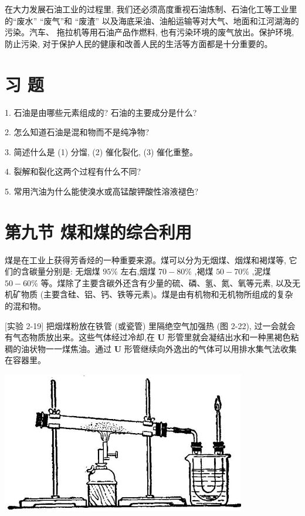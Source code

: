 \documentclass[10pt]{article}
\begin{document}
在大力发展石油工业的过程里, 我们还必须高度重视石油炼制、石油化工等工业里的“废水” “废气”和 “废渣” 以及海底采油、油船运输等对大气、地面和江河湖海的污染。汽车、 拖拉机等用石油产品作燃料, 也有污染环境的废气放出。保护环境, 防止污染, 对于保护人民的健康和改善人民的生活等方面都是十分重要的。

\section*{习 题}

1. 石油是由哪些元素组成的? 石油的主要成分是什么?

2. 怎么知道石油是混和物而不是纯净物?

3. 简述什么是 (1) 分馏, (2) 催化裂化, (3) 催化重整。

4. 裂解和裂化这两个过程有什么不同?

5. 常用汽油为什么能使溴水或高锰酸钾酸性溶液褪色?

\section*{第九节 煤和煤的综合利用}

煤是在工业上获得芳香烃的一种重要来源。煤可以分为无烟煤、烟煤和褐煤等, 它们的含碳量分别是: 无烟煤 \({95}\%\) 左右,烟煤 \({70} - {80}\%\) ,褐煤 \({50} - {70}\%\) ,泥煤 \({50} - {60}\%\) 等。煤除了主要含碳外还含有少量的硫、磷、氢、氮、氧等元素, 以及无机矿物质 (主要含硅、铝、钙、铁等元素)。煤是由有机物和无机物所组成的复杂的混和物。

[实验 2-19] 把烟煤粉放在铁管 (或瓷管) 里隔绝空气加强热 (图 2-22), 过一会就会有气态物质放出来。这些气体经过冷却,在 \(\mathbf{U}\) 形管里就会凝结出水和一种黑褐色粘稠的油状物一一煤焦油。通过 \(\mathbf{U}\) 形管继续向外逸出的气体可以用排水集气法收集在容器里。

\begin{center}
\includegraphics[max width=0.8\textwidth]{images/01912d16-be99-77bb-9535-4f3ed8d9946f_102_351826.jpg}
\end{center}
\end{document}
